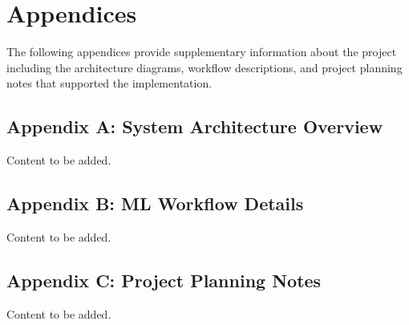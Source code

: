 \documentclass[12pt]{report}
\numberwithin{figure}{chapter}
\numberwithin{table}{chapter}
\numberwithin{equation}{chapter}
\begin{document}
\renewcommand{\bibname}{References}


\chapter*{Appendices}
The following appendices provide supplementary information about the project including the architecture diagrams, workflow descriptions, and project planning notes that supported the implementation.

\section*{Appendix A: System Architecture Overview}
Content to be added.

\section*{Appendix B: ML Workflow Details}
Content to be added.

\section*{Appendix C: Project Planning Notes}
Content to be added.
\end{document}
